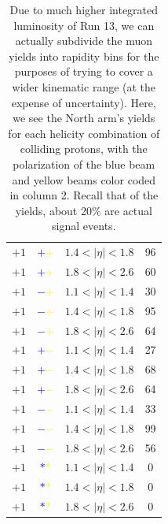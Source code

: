 \begin{table}
\begin{tabular}{cccc}
    $+1$ &\textbf{\textcolor{blue}{$+$}\textcolor{yellow}{$+$}} & $1.4 < \vert\eta\vert < 1.8$ & 96 \\
    $+1$ &\textbf{\textcolor{blue}{$+$}\textcolor{yellow}{$+$}} & $1.8 < \vert\eta\vert < 2.6$ & 60 \\
    $+1$ &\textbf{\textcolor{blue}{$-$}\textcolor{yellow}{$+$}} & $1.1 < \vert\eta\vert < 1.4$ & 30 \\
    $+1$ &\textbf{\textcolor{blue}{$-$}\textcolor{yellow}{$+$}} & $1.4 < \vert\eta\vert < 1.8$ & 95 \\
    $+1$ &\textbf{\textcolor{blue}{$-$}\textcolor{yellow}{$+$}} & $1.8 < \vert\eta\vert < 2.6$ & 64 \\
    $+1$ &\textbf{\textcolor{blue}{$+$}\textcolor{yellow}{$-$}} & $1.1 < \vert\eta\vert < 1.4$ & 27 \\
    $+1$ &\textbf{\textcolor{blue}{$+$}\textcolor{yellow}{$-$}} & $1.4 < \vert\eta\vert < 1.8$ & 68 \\
    $+1$ &\textbf{\textcolor{blue}{$+$}\textcolor{yellow}{$-$}} & $1.8 < \vert\eta\vert < 2.6$ & 64 \\
    $+1$ &\textbf{\textcolor{blue}{$-$}\textcolor{yellow}{$-$}} & $1.1 < \vert\eta\vert < 1.4$ & 33 \\
    $+1$ &\textbf{\textcolor{blue}{$-$}\textcolor{yellow}{$-$}} & $1.4 < \vert\eta\vert < 1.8$ & 99 \\
    $+1$ &\textbf{\textcolor{blue}{$-$}\textcolor{yellow}{$-$}} & $1.8 < \vert\eta\vert < 2.6$ & 56 \\
    $+1$ &\textbf{\textcolor{blue}{$*$}\textcolor{yellow}{$*$}} & $1.1 < \vert\eta\vert < 1.4$ & 0 \\
    $+1$ &\textbf{\textcolor{blue}{$*$}\textcolor{yellow}{$*$}} & $1.4 < \vert\eta\vert < 1.8$ & 0 \\
    $+1$ &\textbf{\textcolor{blue}{$*$}\textcolor{yellow}{$*$}} & $1.8 < \vert\eta\vert < 2.6$ & 0 \\
    \bottomrule
  \end{tabular}
  \caption{
    Due to much higher integrated luminosity of Run 13, we can actually
    subdivide the muon yields into rapidity bins for the purposes of trying to
    cover a wider kinematic range (at the expense of uncertainty). Here, we see
    the North arm's yields for each helicity combination of colliding protons,
    with the polarization of the blue beam and yellow beams color coded in
    column 2. Recall that of the yields, about 20\% are actual signal events.
  }
  \label{tab:north_sorted_muons_eta_bins}
\end{table}

